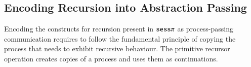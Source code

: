 %




\subsection{Encoding Recursion into Abstraction Passing}

Encoding the constructs for recursion present in $\mathtt{sess}\pi$ as process-passing
communication requires to follow the fundamental
principle of copying the process that needs to exhibit recursive behaviour.
The primitive recursor operation creates copies of a process and uses them
as continuations.

